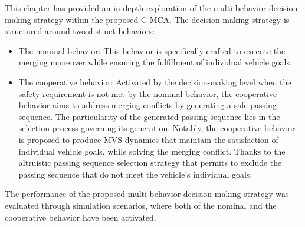  



This chapter has provided an in-depth exploration of the multi-behavior decision-making strategy within the proposed C-MCA. The decision-making strategy is structured around two distinct behaviors:

 \begin{itemize}
     \item The nominal behavior:   This behavior is specifically crafted to execute the merging maneuver while ensuring the fulfillment of individual vehicle goals.

     \item The cooperative behavior:    Activated by the decision-making level when the safety requirement is not met by the nominal behavior, the cooperative behavior aims to address merging conflicts by generating a safe passing sequence. The particularity of the generated passing sequence lies in the selection process governing its generation. Notably, the cooperative behavior is proposed to produce MVS dynamics that maintain the satisfaction of individual vehicle goals, while solving the merging conflict. Thanks to the altruistic passing sequence selection strategy  that permits to exclude the passing sequence that do not meet the vehicle's individual goals. 
 \end{itemize}


The performance of the proposed multi-behavior decision-making strategy was evaluated through simulation scenarios, where both of the nominal and the cooperative behavior have been activated. 



